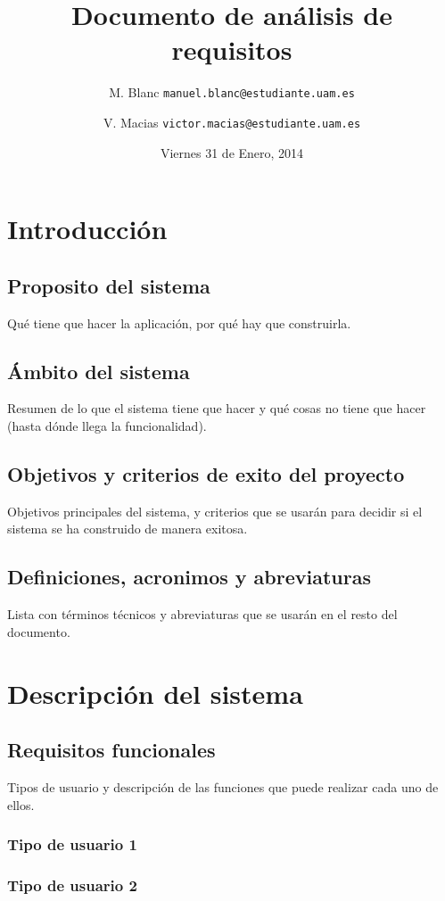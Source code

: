 \documentclass[11pt]{article}
\title{Documento de análisis de requisitos}
\author{M. Blanc \texttt{manuel.blanc@estudiante.uam.es} \and V. Macias \texttt{victor.macias@estudiante.uam.es}}
\date{Viernes 31 de Enero, 2014}
\begin{document}
\clearpage\maketitle
\thispagestyle{empty}
\tableofcontents

\section{Introducción}
\subsection{Proposito del sistema}
Qué tiene que hacer la aplicación, por qué hay que construirla.

\subsection{Ámbito del sistema}
Resumen de lo que el sistema tiene que hacer y qué cosas no tiene que hacer (hasta dónde llega la funcionalidad).

\subsection{Objetivos y criterios de exito del proyecto}
Objetivos principales del sistema, y criterios que se usarán para decidir si el sistema se ha construido de manera exitosa.

\subsection{Definiciones, acronimos y abreviaturas}
Lista con términos técnicos y abreviaturas que se usarán en el resto del documento.

\section{Descripción del sistema}
\subsection{Requisitos funcionales}
Tipos de usuario y descripción de las funciones que puede realizar cada uno de ellos.
\subsubsection{Tipo de usuario 1}
\subsubsection{Tipo de usuario 2}
\end{document}
